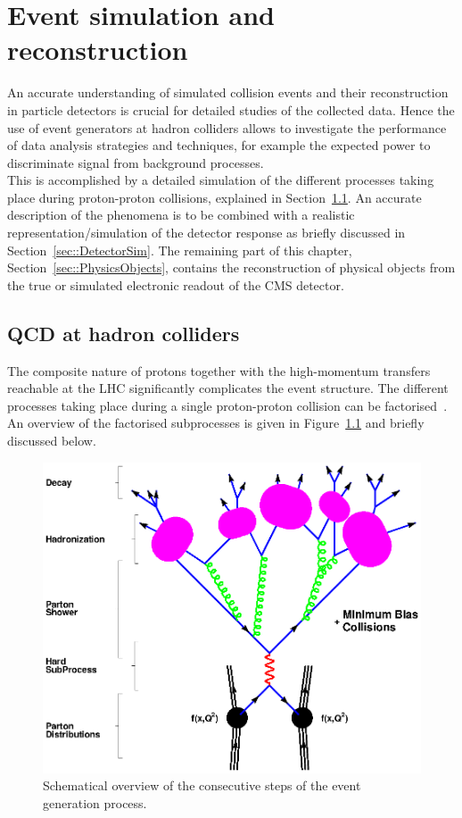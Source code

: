 \chapter{Event simulation and reconstruction} \label{chp:SimReco}

An accurate understanding of simulated collision events and their reconstruction in particle detectors is crucial for detailed studies of the collected data. Hence the use of event generators at hadron colliders allows to investigate the performance of data analysis strategies and techniques, for example the expected power to discriminate signal from background processes.
\\
This is accomplished by a detailed simulation of the different processes taking place during proton-proton collisions, explained in Section~\ref{sec::QCDHadron}. An accurate description of the phenomena is to be combined with a realistic representation/simulation of the detector response as briefly discussed in Section~\ref{sec::DetectorSim}. The remaining part of this chapter, Section~\ref{sec::PhysicsObjects}, contains the reconstruction of physical objects from the true or simulated electronic readout of the CMS detector.

\section{QCD at hadron colliders} \label{sec::QCDHadron}

The composite nature of protons together with the high-momentum transfers reachable at the LHC significantly complicates the event structure. 
The different processes taking place during a single proton-proton collision can be factorised~\cite{Skands:2011pf, Webber:1999ui, Sjostrand:2009ad, Buckley:2011ms, Salam:2010zt}.
An overview of the factorised subprocesses is given in Figure~\ref{fig::EvtShower} and briefly discussed below.

\begin{figure}[htb]
 \centering
 \includegraphics[width = 0.8 \textwidth]{Chapters/Chapter3/Figures/f_shg_event.eps}
 \caption{Schematical overview of the consecutive steps of the event generation process.}  
 \label{fig::EvtShower}
\end{figure}

